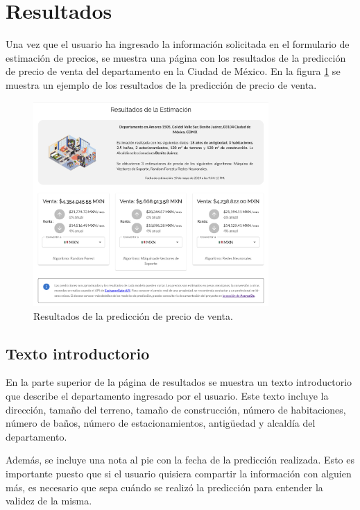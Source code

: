 \section{Resultados}
Una vez que el usuario ha ingresado la información solicitada en el formulario
de estimación de precios, se muestra una página con los resultados de la predicción
de precio de venta del departamento en la Ciudad de México. En la figura \ref{fig:resultados}
se muestra un ejemplo de los resultados de la predicción de precio de venta.

\begin{figure}[H]
    \centering
    \includegraphics[width=0.8\textwidth]{imagenes/03-estimacion-precios/resultados.png}
    \caption{Resultados de la predicción de precio de venta.}
    \label{fig:resultados}
\end{figure}

\subsection{Texto introductorio}
En la parte superior de la página de resultados se muestra un texto introductorio
que describe el departamento ingresado por el usuario. Este texto incluye la dirección,
tamaño del terreno, tamaño de construcción, número de habitaciones, número de baños,
número de estacionamientos, antigüedad y alcaldía del departamento.

Además, se incluye una nota al pie con la fecha de la predicción realizada. Esto
es importante puesto que si el usuario quisiera compartir la información con alguien
más, es necesario que sepa cuándo se realizó la predicción para entender la validez
de la misma.

